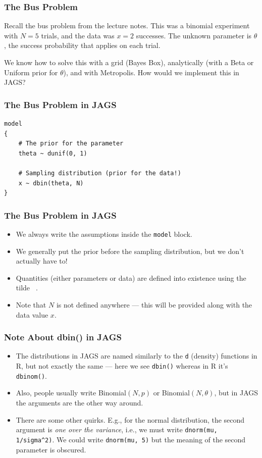 \documentclass{beamer}
\begin{document}
\begin{frame}[fragile]
\frametitle{The Bus Problem}
Recall the bus problem from the lecture notes. This was a binomial experiment
with $N=5$ trials, and the data was $x=2$ successes. The unknown parameter
is $\theta$, the success probability that applies on each trial.

\pause

We know how to solve this with a grid (Bayes Box), analytically (with a Beta
or Uniform prior for $\theta$), and with Metropolis.
How would we implement this in JAGS?

\end{frame}


\begin{frame}[fragile]
\frametitle{The Bus Problem in JAGS}

\begin{verbatim}
model
{
    # The prior for the parameter
    theta ~ dunif(0, 1)

    # Sampling distribution (prior for the data!)
    x ~ dbin(theta, N)
}
\end{verbatim}

\end{frame}

\begin{frame}[fragile]
\frametitle{The Bus Problem in JAGS}
\begin{itemize}
\item We always write the assumptions inside the \texttt{model} block.\pause
\item We generally put the prior before the sampling distribution, but we don't
    actually have to!\pause
\item Quantities (either parameters or data) are defined into existence using
the tilde \texttt{~}.\pause
\item Note that $N$ is not defined anywhere --- this will be provided along
with the data value $x$.
\end{itemize}

\end{frame}

\begin{frame}[fragile]
\frametitle{Note About dbin() in JAGS}

\begin{itemize}
\item The distributions in JAGS are named similarly to the \texttt{d}
(density) functions in R, but not exactly the same --- here we see
\texttt{dbin()} whereas in R it's \texttt{dbinom()}.\pause
\item Also, people usually write Binomial$(N, p)$ or Binomial$(N, \theta)$,
but in JAGS the arguments are the other way around.\pause
\item There are some other quirks. E.g., for the normal distribution, the
second argument is {\em one over the variance}, i.e., we must write
\texttt{dnorm(mu, 1/sigma^2)}. 
We could write \texttt{dnorm(mu, 5)}
but the meaning of the second parameter is obscured.
\end{itemize}

\end{frame}
\end{document}
